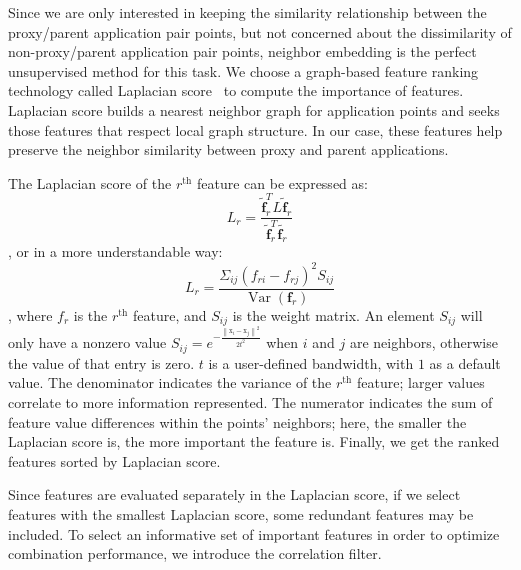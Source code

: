 Since we are only interested in keeping the similarity relationship between the proxy/parent application pair points, but not concerned about the dissimilarity of non-proxy/parent application pair points, neighbor embedding is the perfect unsupervised method for this task. We choose a graph-based feature ranking technology called Laplacian score~\cite{he2005laplacian} to compute the importance of features.  Laplacian score builds a nearest neighbor graph for application points and seeks those features that respect local graph structure. In our case, these features help preserve the neighbor similarity between proxy and parent applications.  

The Laplacian score of the $r^\textrm{th}$ feature can be expressed as:
\begin{equation}L_{r}=\frac{\widetilde{\mathbf{f}}_{r}^{T} L \widetilde{\mathbf{f}}_{r}}{\widetilde{\mathbf{f}}_{r}^{T} \widetilde{\mathbf{f}_{r}}}
\end{equation}
, or in a more understandable way:
\begin{equation}
L_{r}=\frac{\Sigma_{i j}\left(f_{r i}-f_{r j}\right)^{2} S_{i j}}{\operatorname{Var}\left(\mathbf{f}_{r}\right)}
\end{equation} , where $f_r$ is the $r^\textrm{th}$ feature, and $S_{i j}$ is the weight matrix. An element $S_{i j}$ will only have a nonzero value $S_{i j}=e^{-\frac{\left\|\mathrm{x}_{i}-\mathrm{x}_{j}\right\|^{2}}{2t^{2}}}$ when $i$ and $j$ are neighbors, otherwise the value of that entry is zero. $t$ is a user-defined bandwidth, with $1$ as a default value. The denominator indicates the variance of the $r^\textrm{th}$ feature; larger values correlate to more information represented. The numerator indicates the sum of feature value differences within the points' neighbors; here, the smaller the Laplacian score is, the more important the feature is. Finally, we get the ranked features sorted by Laplacian score.

Since features are evaluated separately in the Laplacian score, if we select features with the smallest Laplacian score, some redundant features may be included. To select an informative set of important features in order to optimize combination performance, we introduce the correlation filter.

